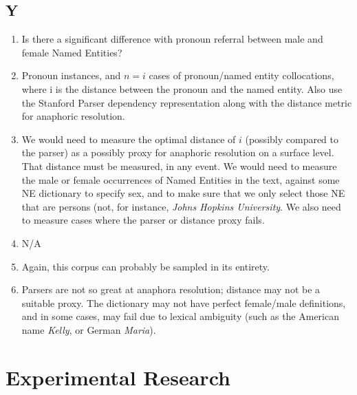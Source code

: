 \documentclass[11pt]{article}
\begin{document}
\subsection{Y}
\begin{enumerate}
\item Is there a significant difference with pronoun referral between male and female Named Entities?
\item Pronoun instances, and $n=i$ cases of pronoun/named entity collocations, where i is the distance between the pronoun and the named entity. Also use the Stanford Parser dependency representation along with the distance metric for anaphoric resolution. 
\item We would need to measure the optimal distance of $i$ (possibly compared to the parser) as a possibly proxy for anaphoric resolution on a surface level. That distance must be measured, in any event. We would need to measure the male or female occurrences of Named Entities in the text, against some NE dictionary to specify sex, and to make sure that we only select those NE that are persons (not, for instance, {\it Johns Hopkins University}. We also need to measure cases where the parser or distance proxy fails. 
\item N/A
\item Again, this corpus can probably be sampled in its entirety. 
\item Parsers are not so great at anaphora resolution; distance may not be a suitable proxy. The dictionary may not have perfect female/male definitions, and in some cases, may fail due to lexical ambiguity (such as the American name {\it Kelly}, or German {\it Maria}).
\end{enumerate}



\section{Experimental Research}
\end{document}
